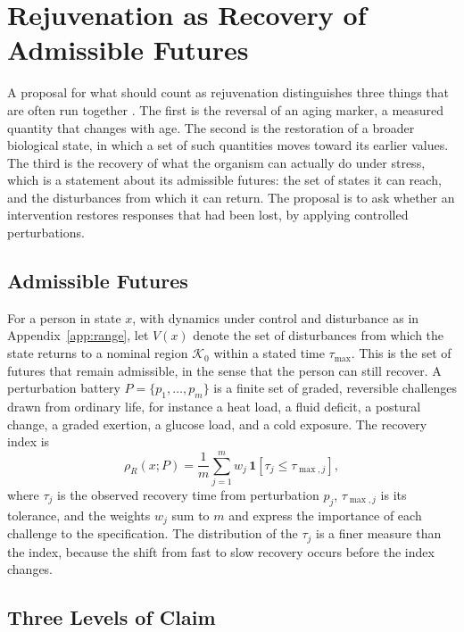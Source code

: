 \documentclass[11pt,openany]{book}
\theoremstyle{definition}
\theoremstyle{remark}
\newcommand{\Kset}{\mathcal{K}}
\begin{document}
\chapter{Rejuvenation as Recovery of Admissible Futures}
\label{ch:futures}

A proposal for what should count as rejuvenation distinguishes three things that are often run together \cite{flyxion2026rejuv}. The first is the reversal of an aging marker, a measured quantity that changes with age. The second is the restoration of a broader biological state, in which a set of such quantities moves toward its earlier values. The third is the recovery of what the organism can actually do under stress, which is a statement about its admissible futures: the set of states it can reach, and the disturbances from which it can return. The proposal is to ask whether an intervention restores responses that had been lost, by applying controlled perturbations.

\section{Admissible Futures}

For a person in state $x$, with dynamics under control and disturbance as in Appendix~\ref{app:range}, let $V(x)$ denote the set of disturbances from which the state returns to a nominal region $\Kset_0$ within a stated time $\tau_{\max}$. This is the set of futures that remain admissible, in the sense that the person can still recover. A perturbation battery $P=\{p_1,\dots,p_m\}$ is a finite set of graded, reversible challenges drawn from ordinary life, for instance a heat load, a fluid deficit, a postural change, a graded exertion, a glucose load, and a cold exposure. The recovery index is
\begin{equation}
\rho_R(x;P)=\frac{1}{m}\sum_{j=1}^{m}w_j\,\mathbf{1}\!\left[\tau_j\le\tau_{\max,j}\right],
\label{eq:recoveryindex}
\end{equation}
where $\tau_j$ is the observed recovery time from perturbation $p_j$, $\tau_{\max,j}$ is its tolerance, and the weights $w_j$ sum to $m$ and express the importance of each challenge to the specification. The distribution of the $\tau_j$ is a finer measure than the index, because the shift from fast to slow recovery occurs before the index changes.

\section{Three Levels of Claim}
\end{document}
